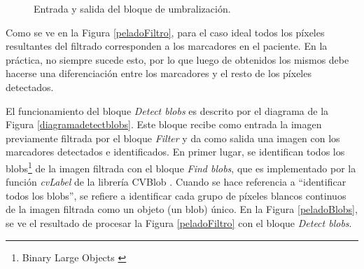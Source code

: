 \begin{figure}[ht!]
        \hspace{-1cm}
         \hspace{0.1cm}        
  \caption{Entrada y salida del bloque de umbralización.}
      \label{ejemploUmbralizacion}
\end{figure}

Como se ve en la Figura \ref{peladoFiltro}, para el caso ideal todos los píxeles resultantes del filtrado corresponden a los marcadores en el paciente. En la práctica, no siempre sucede esto, por lo que luego de obtenidos los mismos debe hacerse una diferenciación entre los marcadores y el resto de los píxeles detectados.

El funcionamiento del bloque \emph{Detect blobs} es descrito por el diagrama de la Figura \ref{diagramadetectblobs}. Este bloque recibe como entrada la imagen previamente filtrada por el bloque \emph{Filter} y da como salida una imagen con los marcadores detectados e identificados. En primer lugar, se identifican todos los blobs\footnote{Binary Large Objects \cite{defBlob}} de la imagen filtrada con el bloque \emph{Find blobs}, que es implementado por la función \emph{cvLabel} de la librería CVBlob \cite{cvblob}. Cuando se hace referencia a ``identificar todos los blobs'', se refiere a identificar cada grupo de píxeles blancos continuos de la imagen filtrada como un objeto (un blob) único. En la Figura \ref{peladoBlobs}, se ve el resultado de procesar la Figura \ref{peladoFiltro} con el bloque \emph{Detect blobs}. 

